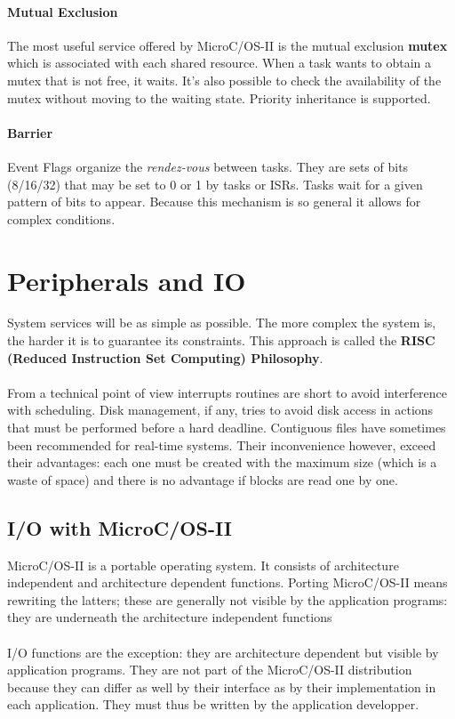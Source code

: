\paragraph{Mutual Exclusion} The most useful service offered by MicroC/OS-II is the mutual exclusion \textbf{mutex} which is associated with each shared resource. When a task wants to obtain a mutex that is not free, it waits. It's also possible to check the availability of the mutex without moving to the waiting state. Priority inheritance is supported.

\paragraph{Barrier} Event Flags organize the \textit{rendez-vous} between tasks. They are sets of bits (8/16/32) that may be set to 0 or 1 by tasks or ISRs. Tasks wait for a given pattern of bits to appear. Because this mechanism is so general it allows for complex conditions. 

\section{Peripherals and IO}
System services will be as simple as possible. The more complex the system is, the harder it is to guarantee its constraints. This approach is called the   \textbf{RISC (Reduced Instruction Set Computing) Philosophy}. 
\\\\
From a technical point of view interrupts routines are short to avoid interference with scheduling. Disk management, if any, tries to avoid disk access in actions that must be performed before a hard deadline. Contiguous files have sometimes been recommended for real-time systems. Their inconvenience however, exceed their advantages: each one must be created with the maximum size (which is a waste of space) and there is no advantage if blocks are read one by one.

\subsection{I/O with MicroC/OS-II}
MicroC/OS-II is a portable operating system. It consists of architecture independent and architecture dependent functions. Porting MicroC/OS-II means rewriting the latters; these are generally not visible by the application programs: they are underneath the architecture independent functions
\\\\
I/O functions are the exception: they are architecture dependent but visible by application programs. They are not part of the MicroC/OS-II distribution because they can differ as well by their interface as by their implementation in each application. They must thus be written by the application developper.



